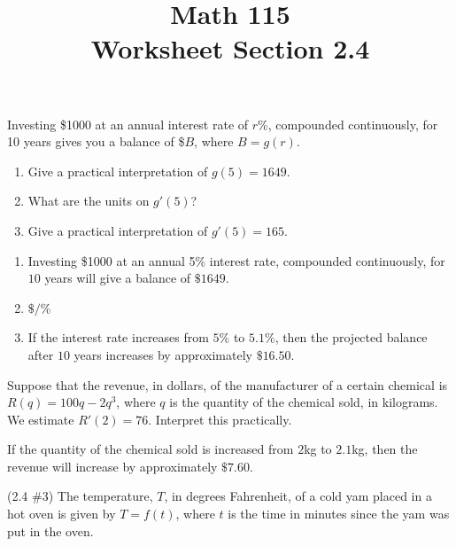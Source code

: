 \documentclass[11pt]{exam}
\title{\vspace{-0.5in} Math 115 \\ Worksheet Section 2.4}
\date{}
\begin{document}
\maketitle
\vspace{-0.75in}
\begin{questions}
%
%
%
%
  \question Investing \$1000 at an annual interest rate of $r$\%, compounded continuously, for 10 years gives you a balance of \$$B$, where $B=g(r)$.  
\begin{enumerate}
	\item Give a practical interpretation of $g(5)=1649$.
	\item What are the units on $g'(5)$?
	\item Give a practical interpretation of $g'(5)=165$.
\end{enumerate}
\begin{solution}
  \begin{enumerate}
  \item Investing \$1000 at an annual 5\% interest rate, compounded continuously, for \(10\) years
    will give a balance of \(\$1649\).
  \item \(\$/\%\)
  \item If the interest rate increases from \(5\%\) to \(5.1\%\), then
    the projected balance after \(10\) years increases by
    approximately \(\$16.50\).
  \end{enumerate}
\end{solution}
\pagebreak
\question Suppose that the revenue, in dollars, of the manufacturer of
  a certain chemical is $R(q)=100q-2q^3$, where $q$ is the quantity of
  the chemical sold, in kilograms. We estimate $R'(2)=76$.
  Interpret this practically.
  \begin{solution}
   If the quantity of the chemical sold is increased from \(2\)kg to
   \(2.1\)kg, then the revenue will increase by approximately \(\$7.60\).
  \end{solution}
\question (2.4 \#3) The temperature, $T$, in degrees Fahrenheit, of a cold yam placed in a hot oven is given by $T=f(t)$, where $t$ is the time in minutes since the yam was put in the oven.
\end{questions}
\end{document}
